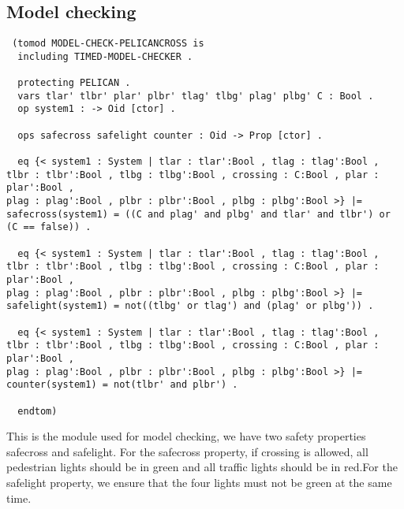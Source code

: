 \documentclass{article}
\begin{document}
\subsection{Model checking}
\begin{verbatim}
 (tomod MODEL-CHECK-PELICANCROSS is
  including TIMED-MODEL-CHECKER .

  protecting PELICAN .
  vars tlar' tlbr' plar' plbr' tlag' tlbg' plag' plbg' C : Bool .
  op system1 : -> Oid [ctor] .
  
  ops safecross safelight counter : Oid -> Prop [ctor] .

  eq {< system1 : System | tlar : tlar':Bool , tlag : tlag':Bool ,
tlbr : tlbr':Bool , tlbg : tlbg':Bool , crossing : C:Bool , plar : plar':Bool ,
plag : plag':Bool , plbr : plbr':Bool , plbg : plbg':Bool >} |= 
safecross(system1) = ((C and plag' and plbg' and tlar' and tlbr') or (C == false)) .

  eq {< system1 : System | tlar : tlar':Bool , tlag : tlag':Bool ,
tlbr : tlbr':Bool , tlbg : tlbg':Bool , crossing : C:Bool , plar : plar':Bool , 
plag : plag':Bool , plbr : plbr':Bool , plbg : plbg':Bool >} |= 
safelight(system1) = not((tlbg' or tlag') and (plag' or plbg')) .

  eq {< system1 : System | tlar : tlar':Bool , tlag : tlag':Bool ,
tlbr : tlbr':Bool , tlbg : tlbg':Bool , crossing : C:Bool , plar : plar':Bool , 
plag : plag':Bool , plbr : plbr':Bool , plbg : plbg':Bool >} |= 
counter(system1) = not(tlbr' and plbr') .

  endtom)
\end{verbatim}
This is the module used for model checking, we have two safety properties safecross and safelight. For the safecross property, if crossing is allowed, all pedestrian lights should be in green and all traffic lights should be in red.For the safelight property, we ensure that the four lights must not be green at the same time.\\

\end{document}
